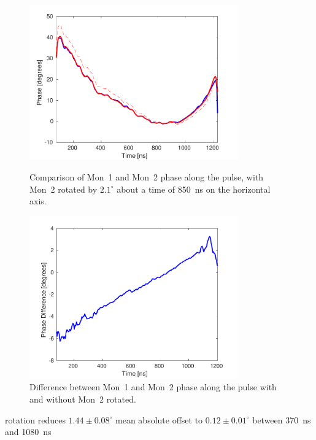 \begin{figure}
  \centering
  \includegraphics[width=0.8\textwidth]{Figures/phaseMons/mon2Rotated}
  \caption{Comparison of Mon~1 and Mon~2 phase along the pulse, with Mon~2 rotated by \(2.1^\circ\) about a time of 850~ns on the horizontal axis.}
  \label{f:mon2Rotated}
  \includegraphics[width=0.8\textwidth]{Figures/phaseMons/DiffMon1Mon2Along}
  \caption{Difference between Mon~1 and Mon~2 phase along the pulse with and without Mon~2 rotated.}
  \label{f:DiffMon1Mon2Along}
\end{figure}

rotation reduces \(1.44\pm0.08^\circ\) mean absolute offset to \(0.12\pm0.01^\circ\) between 370~ns and 1080~ns



